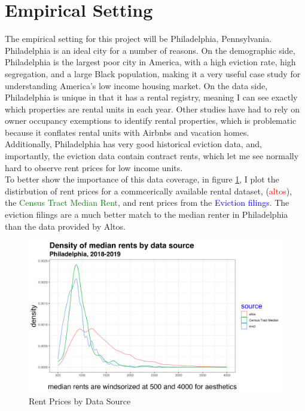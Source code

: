 \documentclass{article}
\begin{document}
\section{Empirical Setting}

The empirical setting for this project will be Philadelphia, Pennsylvania. Philadelphia is an ideal city for a number of reasons. On the demographic side, Philadelphia is the largest poor city in America, with a high eviction rate, high segregation, and a large Black population, making it a very useful case study for understanding America's low income housing market. On the data side, Philadelphia is unique in that it has a rental registry, meaning I can see exactly which properties are rental units in each year. Other studies have had to rely on owner occupancy exemptions to identify rental properties, which is problematic because it conflates rental units with Airbnbs and vacation homes. \\

Additionally, Philadelphia has very good historical eviction data, and, importantly, the eviction data contain contract rents, which let me see normally hard to observe rent prices for low income units. \\

To better show the importance of this data coverage, in figure \ref{fig:rent-dist}, I plot the distirbution of rent prices for a commcerically available rental dataset, (\textcolor{red}{altos}), the \textcolor{green}{Census Tract Median Rent}, and rent prices from the \textcolor{blue}{Eviction filings}. The eviction filings are a much better match to the median renter in Philadelphia than the data provided by Altos.\\
    \begin{figure}
        \centering
        \includegraphics[width=1\linewidth]{figs/density_rent_prices.png}
        \caption{Rent Prices by Data Source}
        \label{fig:rent-dist}
    \end{figure}
\end{document}
